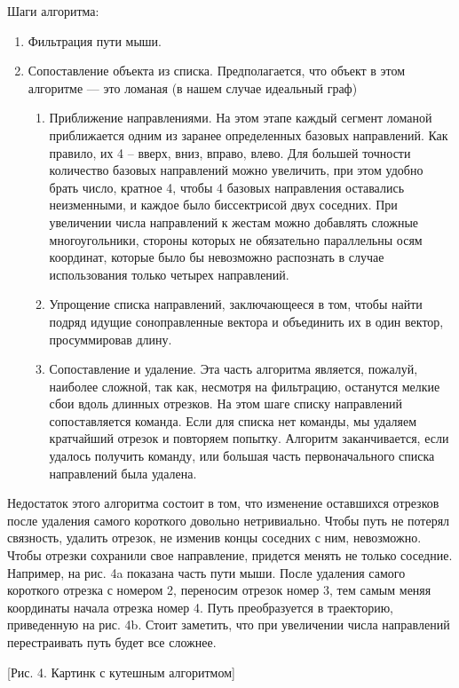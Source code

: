 \documentclass[a5paper]{article}
\begin{document}
Шаги алгоритма:
\begin{enumerate}
  \item Фильтрация пути мыши.
  \item Сопоставление объекта из списка. Предполагается, что объект в этом алгоритме — это ломаная (в нашем случае идеальный граф)
  \begin{enumerate}
    \item Приближение направлениями. На этом этапе каждый сегмент ломаной приближается одним из заранее определенных базовых направлений. 
Как правило, их 4 – вверх, вниз, вправо, влево. Для большей точности количество базовых направлений можно увеличить, при этом удобно 
брать число, кратное 4, чтобы 4 базовых направления оставались неизменными, и каждое было биссектрисой двух соседних. При увеличении числа 
направлений к жестам можно добавлять сложные многоугольники, стороны которых не обязательно параллельны осям координат, которые было бы 
невозможно распознать в случае использования только четырех направлений.
    \item Упрощение списка направлений, заключающееся в том, чтобы найти подряд идущие соноправленные вектора и объединить их в 
один вектор, просуммировав длину.
    \item Сопоставление и удаление. Эта часть алгоритма является, пожалуй, наиболее сложной, так как, несмотря на фильтрацию, останутся 
мелкие сбои вдоль длинных отрезков. На этом шаге списку направлений сопоставляется команда. Если для списка нет команды, мы удаляем 
кратчайший отрезок и повторяем попытку. Алгоритм заканчивается, если удалось получить команду, или большая часть первоначального списка 
направлений была удалена.
  \end{enumerate}
\end{enumerate}

Недостаток этого алгоритма состоит в том, что изменение оставшихся отрезков после удаления самого короткого довольно нетривиально. 
Чтобы путь не потерял связность, удалить отрезок, не изменив концы соседних с ним, невозможно. Чтобы отрезки сохранили свое направление, 
придется менять не только соседние. Например, на рис. 4a показана часть пути мыши. После удаления самого короткого отрезка с номером 2, 
переносим отрезок номер 3, тем самым меняя координаты начала отрезка номер 4. Путь преобразуется в траекторию, приведенную на рис. 4b.
Стоит заметить, что при увеличении числа направлений перестраивать путь будет все сложнее. 

[Рис. 4. Картинк с кутешным алгоритмом]
\end{document}
